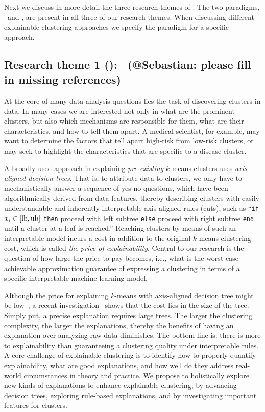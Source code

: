 \documentclass[a4paper,11pt]{article}
\begin{document}
Next we discuss in more detail the three research themes of \acronym.
The two paradigms, \posthoc\ and \joint, are present in all three of our research themes.
When discussing different explainable-clustering approaches 
we specify the paradigm for a specific approach.

\subsection*{Research theme 1 (\rto): \newmodels\ {\color{orange}(@Sebastian: please fill in missing references)}}

At the core of many data-analysis questions lies the task of discovering clusters in data. 
In many cases we are interested not only in what are the prominent clusters, 
but also which mechanisms are responsible for them,  
what are their characteristics, and how to tell them apart.  
A medical scientist, for example, may want to determine the factors that tell apart 
high-risk from low-risk clusters, 
or may seek to highlight the characteristics that are specific to a disease cluster.  

A broadly-used \posthoc approach in explaining \emph{pre-existing} $k$-means clusters uses 
\emph{axis-aligned decision trees}. 
That is, to attribute data to clusters, 
we only have to mechanistically answer a sequence of yes-no questions, 
which have been algorithmically derived from data features, 
thereby describing clusters with easily understandable and inherently interpretable axis-aligned rules (cuts), 
such as 
``\texttt{if} $x_i \in [\textnormal{lb}, \textnormal{ub}]$ \texttt{then} 
proceed with left subtree \texttt{else} proceed with right subtree \texttt{end} until a cluster at a leaf is reached.''
Reaching clusters by means of such an interpretable model incurs 
a cost in addition to the original $k$-means clustering cost, 
which is called \emph{the price of explainability}.
Central to our research is the question of how large the price to pay becomes, i.e., 
what is the worst-case achievable approximation guarantee of expressing a clustering 
in terms of a specific interpretable machine-learning model. 

Although the price for explaining $k$-means with axis-aligned decision tree might be low~\cite{XXX}, 
a recent investigation~\cite{XXX} shows that the cost lies in the size of the tree.
Simply put, a precise explanation requires large trees.
The larger the clustering complexity, the larger the explanations, thereby 
the benefits of having an explanation over analyzing raw data diminishes.
The bottom line is: there is more to explainability than guaranteeing a clustering quality under interpretable rules.
A core challenge of explainable clustering is to identify how to properly quantify explainability,
what are good explanations, and how well do they address real-world circumstances in theory and practice.
We propose to holistically explore new kinds of explanations to enhance explainable clustering,
by advancing decision trees, exploring rule-based explanations, and by investigating important features for clusters.
\end{document}
